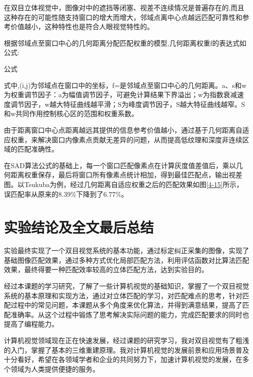 在双目立体视觉中，图像对中的遮挡等闭塞、视差不连续情况是普遍存在的,而且这种存在的可能性随支持窗口的增大而增大，邻域点离中心点越远匹配可靠性和参考价值越小，这种特性也是符合人眼视觉特性的。


根据邻域点至窗口中心的几何距离分配匹配权重的模型,几何距离权重f的表达式如公式: 

{{{公式}}}

式中,(i,j)为邻域点在窗口中的坐标，f=是邻域点至窗口中心的几何距离。a、s和w为权重调节因子：a为幅值调节因子，可避免计算结果下界溢出；w为指数衰减速度调节因子，w越大特征曲线越平滑；S为峰度调节因子，S越大特征曲线越窄。S和w共同作用控制核心区的范围和权重系数。

由于距离窗口中心点距离越远其提供的信息参考价值越小，通过基于几何距离自适应权重，来解决窗口内像素点贡献无差异的问题，从而提高低纹理和深度非连续区域的匹配准确性。

在SAD算法公式的基础上，每一个窗口匹配像素点在计算灰度值差值后，乘以几何距离权重保存，最后将窗口所有像素点统计相加，得到最佳匹配点，输出视差图。以Tsukuba为例，经过几何距离自适应权重之后的匹配效果如图\ref{4-15}所示，误匹配率从原来的8.39\%下降到了6.77\%。


\section{实验结论及全文最后总结}

实验最终实现了一个双目视觉系统的基本功能，通过标定纠正采集的图像，实现了基础图像匹配效果，通过多种方式优化局部匹配方法，利用评估函数对比算法匹配效果，最终得要一种匹配效率较高的立体匹配方法，达到实验目的。

经过本课题的学习研究，了解了一些计算机视觉的基础知识，掌握了一个双目视觉系统的基本原理和实现方法，通过对立体匹配的学习，对匹配难点的思考，针对匹配过程中的常见问题，本课题从多个角度来优化算法，并得到满意结果，提高了匹配准确率。从这个过程中锻炼了思考解决实际问题的能力，完成匹配要求的同时也提高了编程能力。

计算机视觉领域现在正在快速发展，经过课题的研究学习，我对双目视觉有了粗浅的入门，掌握了基本的三维重建原理。我对计算机视觉的发展前景和应用场景普及十分看好，希望在各领域学者和企业的共同努力下，加速计算机视觉的发展，在多个领域为人类提供便捷的服务。